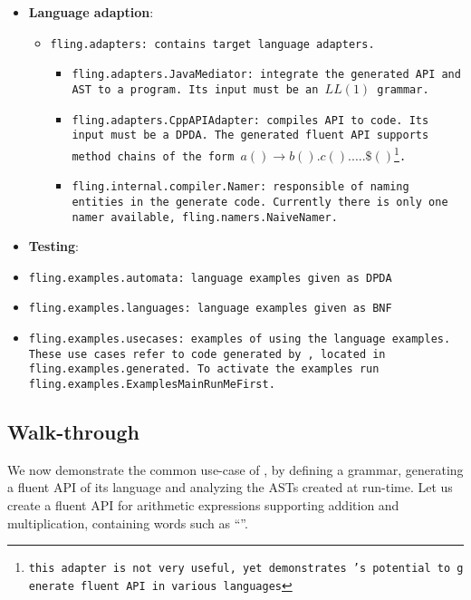 \documentclass[a4paper,UKenglish,cleveref, autoref]{darts-v2019}
\begin{document}
\begin{content}
\begin{itemize}
	\item \textbf{Language adaption}:
	\begin{itemize}
		\item \tt{fling.adapters}: contains target language adapters.
		\begin{itemize}
      \item \tt{fling.adapters.JavaMediator}: integrate the generated API and
        AST to a \Java program.  Its input must be an~$LL(1)$ grammar.
      \item \tt{fling.adapters.CppAPIAdapter}: compiles API to \CC code. Its
        input must be a DPDA.  The generated \CC fluent API supports method
        chains of the form~\mbox{$a()\rightarrow b().c().\ldots.\$()$\footnote{
			this adapter is not very useful, yet demonstrates \Fling's potential to generate fluent API in various
		languages}}.
		\item \tt{fling.internal.compiler.Namer}: responsible of naming entities in the generate code.
		Currently there is only one namer available, \tt{fling.namers.NaiveNamer}.
		\end{itemize}
	\end{itemize}
	\item \textbf{Testing}:
		\item \tt{fling.examples.automata}: language examples given as DPDA
		\item \tt{fling.examples.languages}: language examples given as BNF
		\item \tt{fling.examples.usecases}: examples of using the language examples.
		These use cases refer to code generated by \Fling, located in \tt{fling.examples.generated}.
		To activate the examples run \tt{fling.examples.ExamplesMainRunMeFirst}.
\end{itemize}

\subsection{Walk-through}

We now demonstrate the common use-case of \Fling, by defining
a grammar, generating a fluent API of its language and analyzing
the ASTs created at run-time.
Let us create a fluent API for arithmetic expressions supporting addition
and multiplication, containing words such as ``''.

\begin{enumerate}
	

\end{enumerate}
\end{content}
\end{document}
